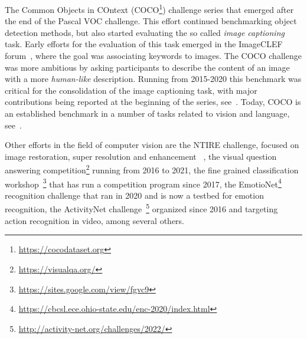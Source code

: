 \documentclass[twoside,11pt]{article}
\begin{document}
The Common Objects in COntext  (COCO\footnote{\url{https://cocodataset.org}})  challenge series that emerged after the end of the Pascal VOC challenge. This effort continued benchmarking object detection methods, but also started evaluating the so called \emph{image captioning} task. Early efforts for the evaluation of this task emerged in the ImageCLEF forum~\citep{DBLP:books/daglib/p/CloughMS10,DBLP:journals/cviu/EscalanteHGLMMSPG10}, where the goal was associating keywords to images. The COCO challenge was more ambitious by asking participants to describe the content of an image with a more \emph{human-like} description. Running from 2015-2020 this benchmark was critical for the consolidation of the image captioning task, with major contributions being reported at the beginning of the series, see~\citep{DBLP:journals/ijon/BaiA18,DBLP:journals/corr/abs-2107-06912}. Today, COCO is an established benchmark in a number of tasks related to vision and language, see~\citep{DBLP:conf/eccv/LinMBHPRDZ14}. 

Other  efforts in the field of computer vision are the NTIRE challenge, focused on image restoration, super resolution and enhancement~\citep{DBLP:conf/cvpr/TimofteAG0ZLSKN17,ntire22} , the visual question answering competition\footnote{\url{https://visualqa.org/}} running from 2016 to 2021, the fine grained classification workshop~\footnote{\url{https://sites.google.com/view/fgvc9}} that has  run a competition program since 2017, the EmotioNet\footnote{\url{https://cbcsl.ece.ohio-state.edu/enc-2020/index.html}} recognition challenge that ran in 2020 and is now a testbed for emotion recognition, the ActivityNet  challenge~\footnote{\url{http://activity-net.org/challenges/2022/}} organized since 2016 and  targeting action recognition  in video, among several others. 

\end{document}
